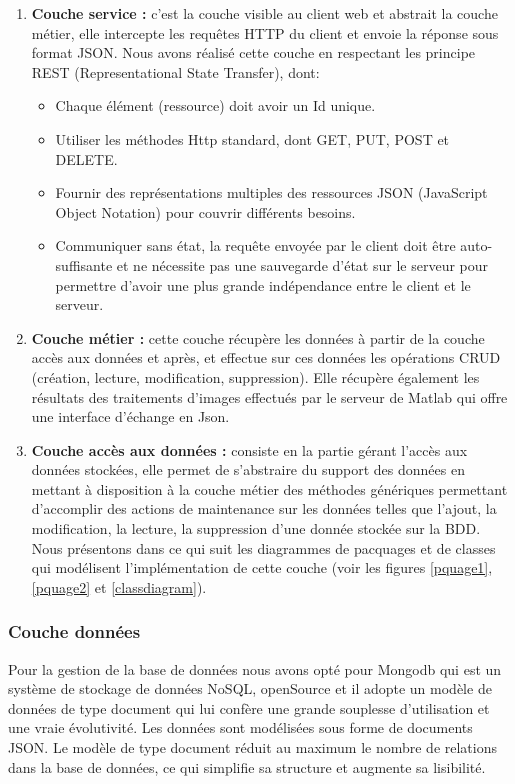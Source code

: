 \begin{enumerate}
	\item \textbf{Couche service :} c'est la couche visible au client web et abstrait la couche métier, elle intercepte les requêtes HTTP du client et envoie la réponse sous format JSON. Nous avons réalisé cette couche en respectant les principe REST (Representational State Transfer), dont:
	\begin{itemize}
		\item	Chaque élément (ressource) doit avoir un Id unique.
		\item	Utiliser les méthodes Http standard, dont GET, PUT, POST et DELETE.
		\item	Fournir des représentations multiples des ressources JSON (JavaScript Object Notation) pour couvrir différents besoins. 
		\item	Communiquer sans état, la requête envoyée par le client doit être auto-suffisante et ne nécessite pas une sauvegarde d’état sur le serveur pour permettre d'avoir une plus grande indépendance entre le client et le serveur. 
	\end{itemize}
	\item \textbf{Couche métier :} cette couche récupère les données à partir de la couche accès aux données et après, et effectue sur ces données les opérations CRUD (création, lecture, modification, suppression). Elle récupère également les résultats des traitements d’images effectués par le serveur de Matlab qui offre une interface d’échange en Json.

	\item 
\textbf{Couche accès aux données : }consiste en la partie gérant l'accès aux données stockées, elle permet de s’abstraire du support des données en mettant à disposition à la couche métier des méthodes génériques permettant d’accomplir des actions de maintenance sur les données telles que l’ajout, la modification, la lecture, la suppression d’une donnée stockée sur la BDD.
	Nous présentons dans ce qui suit les diagrammes de pacquages et de classes qui modélisent l'implémentation de cette couche (voir les figures \ref{pquage1}, \ref{pquage2} et \ref{classdiagram}).

\end{enumerate}
\subsubsection{Couche données}
Pour la gestion de la base de données nous avons opté pour Mongodb qui est un système de stockage de données NoSQL, openSource et il adopte un modèle de données de type document qui lui confère une grande souplesse d’utilisation et une vraie évolutivité. Les données sont modélisées sous forme de documents JSON. Le modèle de type document réduit au maximum le nombre de relations dans la base de données, ce qui simplifie sa structure et augmente sa lisibilité.
\clearpage

